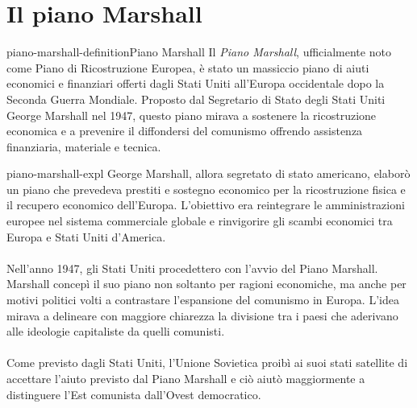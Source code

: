 \documentclass[preview]{standalone}
\begin{document}
\genpage

\section{Il piano Marshall}

\begin{snippetdefinition}{piano-marshall-definition}{Piano Marshall}
    Il \textit{Piano Marshall}, ufficialmente noto come Piano di Ricostruzione Europea,
    è stato un massiccio piano di aiuti economici e finanziari offerti dagli Stati Uniti
    all'Europa occidentale dopo la Seconda Guerra Mondiale.
    Proposto dal Segretario di Stato degli Stati Uniti George Marshall nel 1947,
    questo piano mirava a sostenere la ricostruzione economica e a prevenire
    il diffondersi del comunismo offrendo assistenza finanziaria, materiale e tecnica.
\end{snippetdefinition}

\begin{snippet}{piano-marshall-expl}
    George Marshall, allora segretato di stato americano, elaborò un piano che prevedeva prestiti e sostegno economico
    per la ricostruzione fisica e il recupero economico dell'Europa. L'obiettivo era reintegrare le amministrazioni
    europee nel sistema commerciale globale e rinvigorire gli scambi economici tra Europa e Stati Uniti d'America.
    \\\\
    Nell'anno 1947, gli Stati Uniti procedettero con l'avvio del Piano Marshall.
    Marshall concepì il suo piano non soltanto per ragioni economiche, ma anche per motivi politici volti a contrastare
    l'espansione del comunismo in Europa. L'idea mirava a delineare con maggiore chiarezza la divisione tra i paesi
    che aderivano alle ideologie capitaliste da quelli comunisti.
    \\\\
    Come previsto dagli Stati Uniti, l'Unione Sovietica proibì ai suoi stati satellite di accettare l'aiuto previsto dal
    Piano Marshall e ciò aiutò maggiormente a distinguere l'Est comunista dall'Ovest democratico.
\end{snippet}
\end{document}
